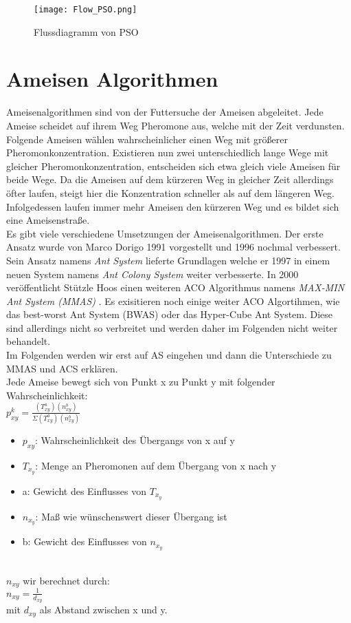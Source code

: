 \begin{figure}
  \centering
  \texttt{[image: Flow\_PSO.png]}
  \caption{Flussdiagramm von PSO}
  \label{fig:Figure_PSO}
\end{figure}


\section{Ameisen Algorithmen}
Ameisenalgorithmen sind von der Futtersuche der Ameisen abgeleitet. Jede Ameise scheidet auf ihrem Weg Pheromone aus, welche mit der Zeit verdunsten. 
Folgende Ameisen wählen wahrscheinlicher einen Weg mit größerer Pheromonkonzentration. 
Existieren nun zwei unterschiedlich lange Wege mit gleicher Pheromonkonzentration, entscheiden sich etwa gleich viele Ameisen für beide Wege. 
Da die Ameisen auf dem kürzeren Weg in gleicher Zeit allerdings öfter laufen, steigt hier die Konzentration schneller als auf dem längeren Weg. 
Infolgedessen laufen immer mehr Ameisen den kürzeren Weg und es bildet sich eine Ameisenstraße.\\

Es gibt viele verschiedene Umsetzungen der Ameisenalgorithmen. Der erste Ansatz wurde von Marco Dorigo 1991 vorgestellt\cite{Dorigo1991AntSA} und 1996 nochmal verbessert\cite{484436}.
Sein Ansatz namens \emph{Ant System} lieferte Grundlagen welche er 1997 in einem neuen System namens \emph{Ant Colony System} weiter verbesserte\cite{585892}. In 2000 veröffentlicht Stützle Hoos einen weiteren ACO Algorithmus namens \emph{MAX-MIN Ant System (MMAS)} \cite{STUTZLE2000889}. Es exisitieren noch einige weiter ACO Algortihmen, wie das best-worst Ant System (BWAS)\cite{cordon2000new} oder das Hyper-Cube Ant System. Diese sind allerdings nicht so verbreitet und werden daher im Folgenden nicht weiter behandelt.\cite{blum2004hyper}   \\
Im Folgenden werden wir erst auf AS eingehen und dann die Unterschiede zu MMAS und ACS erklären.\\
Jede Ameise bewegt sich von Punkt x zu Punkt y mit folgender Wahrscheinlichkeit:\\

\large$p_{xy}^k=\frac{(T_{xy}^a)(n_{xy}^b)}{\Sigma(T_{xy}^a)(n_{xy}^b) }$
\normalsize
\begin{itemize}
  \item $p_{xy}$: Wahrscheinlichkeit des Übergangs von x auf y
  \item $T_x_y$: Menge an Pheromonen auf dem Übergang von x nach y 
  \item a: Gewicht des Einflusses von $T_x_y$
  \item $n_x_y$: Maß wie wünschenswert dieser Übergang ist
  \item b: Gewicht des Einflusses von $n_x_y$
\end{itemize}
\\
$n_{xy}$ wir berechnet durch:\\\large
$n_{xy}=\frac{1}{d_{xy}}$\\\normalsize
mit $d_{xy}$ als Abstand zwischen x und y.\\

